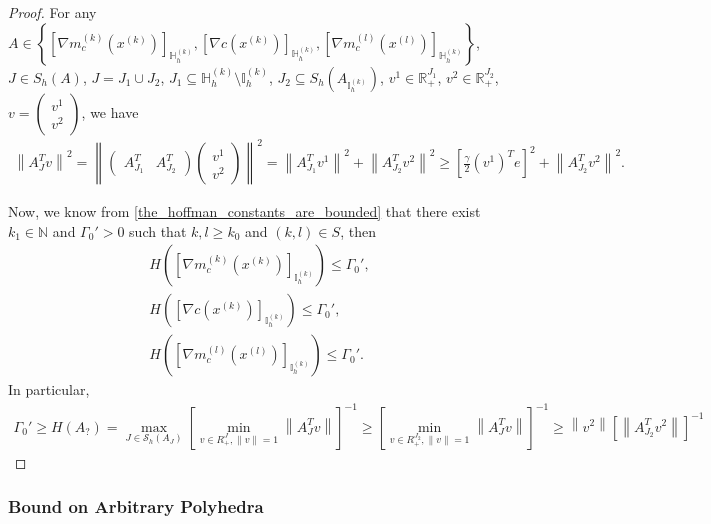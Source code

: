 \documentclass{article}
\theoremstyle{case}
\numberwithin{theorem}{subsection}
\newcommand{\huff}{{\Gamma_0}}
\newcommand{\naturals}{\mathbb N}
\newcommand{\xk}{x^{(k)}}
\newcommand{\xl}{{x^{(l)}}}
\newcommand{\activeindicesk}{{ \mathbb I_h^{(k)} }}
\newcommand{\huffindicesk}{{ \mathbb H_h^{(k)} }}
\newcommand{\modeljack}{{ \nabla m^{(k)}_{c}\left(\xk\right) }}
\newcommand{\modeljacl}{{ \nabla m^{(l)}_{c}\left(\xl\right) }}
\newcommand{\truejack}{{ \nabla c\left(\xk\right) }}
\begin{document}
\begin{proof}
For any $A \in \left\{
\left[\modeljack\right]_{\huffindicesk},
\left[\truejack\right]_{\huffindicesk},
\left[\modeljacl\right]_{\huffindicesk}
\right\}$,
$J \in S_h\left(A\right)$, 
$J = J_1 \cup J_2$, 
$J_1 \subseteq \huffindicesk \setminus \activeindicesk$,
$J_2 \subseteq S_h\left(A_{\activeindicesk}\right)$,
$v^1 \in \mathbb R^{J_1}_+$, 
$v^2 \in \mathbb R^{J_2}_+$, 
$v = 
\begin{pmatrix}
v^1 \\ v^2
\end{pmatrix}$, we have
\begin{align*}
\left\|A_J^T v\right\|^2 = 
\left\|
\begin{pmatrix}
A_{J_1}^T & A_{J_2}^T
\end{pmatrix}
\begin{pmatrix}
v^1 \\ v^2
\end{pmatrix}
\right\|^2 = 
\left\| A_{J_1}^T v^1\right\|^2 + \left\| A_{J_2}^T v^2\right\|^2
\ge 
\left[\frac {\gamma} {2} \left(v^1\right)^Te\right]^2 + \left\| A_{J_2}^T v^2\right\|^2.
\end{align*}

Now, we know from \cref{the_hoffman_constants_are_bounded} that there exist $k_1 \in \naturals$ and $\huff'>0$ such that
$k,l \ge k_0$ and $(k,l) \in S$, then
\begin{align*}
H\left(\left[\modeljack\right]_{\activeindicesk}\right) \le \huff', \\
H\left(\left[\truejack\right]_{\activeindicesk}\right) \le \huff', \\
H\left(\left[\modeljacl\right]_{\activeindicesk}\right) \le \huff'.
\end{align*}
In particular,
\begin{align*}
\huff' \ge H\left(A_{?}\right)
= \max_{J \in \mathcal S_h(A_J)} \left[\min_{v \in R^J_+, \|v\| = 1}  \left\|A_J^Tv\right\| \right]^{-1}
\ge \left[\min_{v \in R^{J_2}_+, \|v\| = 1}  \left\|A_J^Tv\right\| \right]^{-1}
\ge \left\|v^2\right\|\left[\left\|A_{J_2}^Tv^2\right\| \right]^{-1}
\end{align*}





\end{proof}





\subsubsection{Bound on Arbitrary Polyhedra}
\end{document}
